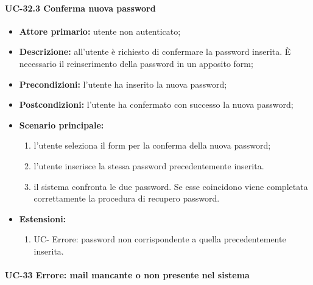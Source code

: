\paragraph{UC-32.3 Conferma nuova password}

	\begin{itemize}
		\item \textbf{Attore primario:} utente non autenticato;

		\item \textbf{Descrizione:} all'utente è richiesto di confermare la password inserita. \`{E} necessario il reinserimento della password in un apposito form;

		\item \textbf{Precondizioni:} l'utente ha inserito la nuova password;

		\item \textbf{Postcondizioni:} l'utente ha confermato con successo la nuova password;

		\item \textbf{Scenario principale:}
	  		\begin{enumerate}
		  		\item l'utente seleziona il form per la conferma della nuova password;
		  		\item l'utente inserisce la stessa password precedentemente inserita.
		  		\item il sistema confronta le due password. Se esse coincidono viene completata correttamente la procedura di recupero password.
	  		\end{enumerate}
	  	\item \textbf{Estensioni:}
	  		\begin{enumerate}
		  		\item UC- Errore: password non corrispondente a quella precedentemente inserita.
	  		\end{enumerate}
	\end{itemize}

\paragraph{UC-33 Errore: mail mancante o non presente nel sistema}

